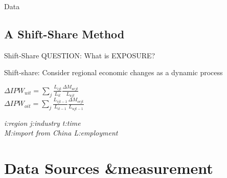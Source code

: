 \documentclass[10pt,aspectratio=43,mathserif,table]{beamer}
\begin{document}
\begin{frame}{Data}
	\centering
\end{frame}

\subsection{A Shift-Share Method}
\begin{frame}{Shift-Share}
\alert{QUESTION: What is EXPOSURE?}
\begin{block}{Shift-share:	Consider regional economic changes as a dynamic process}

\begin{center}
	\Large $\Delta IPW_{uit}=\sum_{j} \frac{L_{ijt}}{L_{it}} \frac{\Delta M_{ucjt}}{L_{ujt}} $
    \\[5mm]
	\Large $\Delta IPW_{oit}=\sum_{j} \frac{L_{ijt-1}}{L_{it-1}} \frac{\Delta M_{ocjt}}{L_{ujt-1}} $
\end{center}
	\textit{i:region \qquad j:industry \qquad t:time \\  M:import from China \quad L:employment}
\end{block}
\end{frame}





\section{Data Sources \&measurement}  
\end{document}
